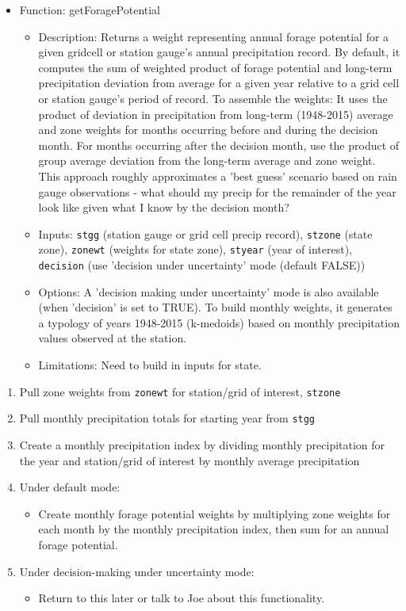 \documentclass[11pt]{article}
\begin{document}
\begin{itemize}
\item Function: getForagePotential
	\begin{itemize}
	\item Description: Returns a weight representing annual forage potential for a given gridcell or station gauge's annual precipitation record. By default, it	computes the sum of weighted product of forage potential and long-term precipitation deviation from average for a given year relative to a grid cell or station gauge's period of record. To assemble the weights: It uses the product of deviation in precipitation from long-term (1948-2015) average and zone weights for months occurring before and during the decision month. For months occurring after the decision month, use the product of group average deviation from the long-term average and zone weight. This approach roughly approximates a 'best guess' scenario based on rain gauge observations - what should my precip for the remainder of the year look like given what I know by the decision month?
	\item Inputs: \verb!stgg! (station gauge or grid cell precip record), \verb!stzone! (state zone), \verb!zonewt! (weights for state zone), \verb!styear! (year of interest), \verb!decision! (use 'decision under uncertainty' mode (default FALSE))
	\item Options: A 'decision making under uncertainty' mode is also available (when 'decision' is set to TRUE). To build monthly weights, it generates a typology of years 1948-2015 (k-medoids) based on monthly precipitation values observed at the station.
	\item Limitations: Need to build in inputs for state.
	\end{itemize}
\end{itemize}

\begin{enumerate}
\item Pull zone weights from \verb!zonewt! for station/grid of interest, \verb!stzone!
\item Pull monthly precipitation totals for starting year from \verb!stgg!
\item Create a monthly precipitation index by dividing monthly precipitation for the year and station/grid of interest by monthly average precipitation
\item Under default mode: 
	\begin{itemize}
	\item Create monthly forage potential weights by multiplying zone weights for each month by the monthly precipitation index, then sum for an annual forage potential.
	\end{itemize}
\item Under decision-making under uncertainty mode:
	\begin{itemize}
	\item Return to this later or talk to Joe about this functionality. 
	\end{itemize}
\end{enumerate}
\end{document}
